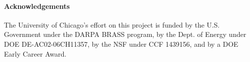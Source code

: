 \documentclass[sigconf,natbib=false]{acmart}
\begin{document}
\maketitle





\paragraph*{Acknowledgements}
The University of
  Chicago's effort on this project is funded by the U.S. Government
  under the DARPA BRASS program, by the Dept. of Energy under DOE
  DE-AC02-06CH11357, by the NSF under CCF 1439156, and by a DOE Early
  Career Award.


% 
% 
\printbibliography
\end{document}
